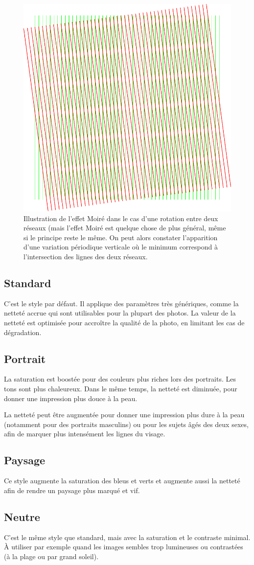 \documentclass[a4paper,twoside]{article}
\begin{document}
\begin{figure}[htb]
\centering
\includegraphics[width=0.25\linewidth]{figure/effet_moire.pdf}
\caption{Illustration de l'effet Moiré dans le cas d'une rotation entre deux réseaux (mais l'effet Moiré est quelque chose de plus général, même si le principe reste le même. On peut alors constater l'apparition d'une variation périodique verticale où le minimum correspond à l'intersection des lignes des deux réseaux.}\label{fig:effet_moire}
\end{figure}

\subsection{Standard}
C'est le style par défaut. Il applique des paramètres très génériques, comme la netteté accrue qui sont utilisables pour la plupart des photos. La valeur de la netteté est optimisée pour accroître la qualité de la photo, en limitant les cas de dégradation.

\subsection{Portrait}
La saturation est boostée pour des couleurs plus riches lors des portraits. Les tons sont plus chaleureux. Dans le même temps, la netteté est diminuée, pour donner une impression plus douce à la peau. 

\begin{remarque}
La netteté peut être augmentée pour donner une impression plus dure à la peau (notamment pour des portraits masculins) ou pour les sujets âgés des deux sexes, afin de marquer plus intensément les lignes du visage.
\end{remarque}

\subsection{Paysage}
Ce style augmente la saturation des bleus et verts et augmente aussi la netteté afin de rendre un paysage plus marqué et vif.


\subsection{Neutre}
C'est le même style que standard, mais avec la saturation et le contraste minimal. À utiliser par exemple quand les images sembles trop lumineuses ou contrastées (à la plage ou par grand soleil).
\end{document}
